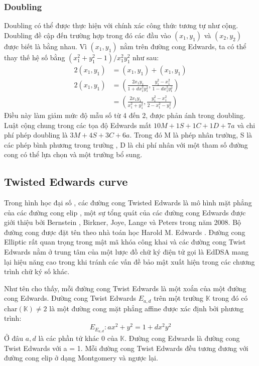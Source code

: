\documentclass[a4paper,12pt]{report}
\begin{document}
\subsubsection*{Doubling}
Doubling có thể được thực hiện với chính xác công thức tương tự như cộng. Doubling đề cập đến trường hợp trong đó các đầu vào $(x_1, y_1)$ và $(x_2, y_2)$ được biết là bằng nhau. Vì $(x_1, y_1)$ nằm trên đường cong Edwards, ta có thể thay thế hệ số bằng $(x_1^2 + y_1^2  - 1)/x_1^2y_1^2$ như sau:
\begin{displaymath}
{\begin{aligned}2(x_{1},y_{1})&=(x_{1},y_{1})+(x_{1},y_{1})\\[6pt]2(x_{1},y_{1})&=\left({\frac  {2x_{1}y_{1}}{1+dx_{1}^{2}y_{1}^{2}}},{\frac  {y_{1}^{2}-x_{1}^{2}}{1-dx_{1}^{2}y_{1}^{2}}}\right)\\[6pt]&=\left({\frac  {2x_{1}y_{1}}{x_{1}^{2}+y_{1}^{2}}},{\frac  {y_{1}^{2}-x_{1}^{2}}{2-x_{1}^{2}-y_{1}^{2}}}\right)\end{aligned}}
\end{displaymath}
Điều này làm giảm mức độ mẫu số từ 4 đến 2, được phản ánh trong doubling. Luật cộng chung trong các tọa độ Edwards mất $10M + 1S + 1C + 1D + 7a$ và chi phí phép doubling là $3M + 4S + 3C + 6a$. Trong đó M là phép nhân trường, S là các phép bình phương trong trường , D là chi phí nhân với một tham số đường cong có thể lựa chọn và một trường bổ sung.
\subsection*{Twisted Edwards curve}
Trong hình học đại số , các đường cong Twisted Edwards là mô hình mặt phẳng của các đường cong elip , một sự tổng quát của các đường cong Edwards được giới thiệu bởi Bernstein , Birkner, Joye, Lange và Peters trong năm 2008. Bộ đường cong được đặt tên theo nhà toán học Harold M. Edwards . Đường cong Elliptic rất quan trọng trong mật mã khóa công khai và các đường cong Twist Edwards nằm ở trung tâm của một lược đồ chữ ký điện tử gọi là EdDSA mang lại hiệu năng cao trong khi tránh các vấn đề bảo mật xuất hiện trong các chương trình chữ ký số khác.

Như tên cho thấy, mỗi đường cong Twist Edwards là một xoắn của một đường cong Edwards. Đường cong Twist Edwards $E_{a, d}$ trên một trường $\displaystyle \mathbb{K}$ trong đó có $\displaystyle \mathrm{char}(\mathbb{K}) \neq 2$ là một đường cong mặt phẳng affine được xác định bởi phương trình:
\begin{displaymath}
E_{E_{a,d}}: ax^2 + y^2 = 1 + dx^2y^2
\end{displaymath}
Ở đâu $a, d$ là các phần tử khác 0 của $\displaystyle \mathbb{K}$. Đường cong Edwards là đường cong Twist Edwards với a = 1.
Mỗi đường cong Twist Edwards đều tương đương với đường cong elip ở dạng Montgomery và ngược lại.
\end{document}
